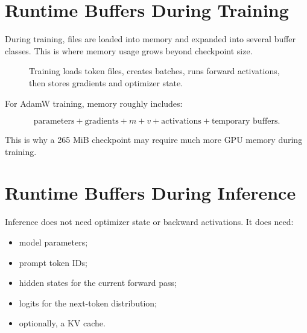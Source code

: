 \section{Runtime Buffers During Training}

During training, files are loaded into memory and expanded into several buffer classes.
This is where memory usage grows beyond checkpoint size.

\begin{figure}[htbp]
\centering
{}
\caption{Training loads token files, creates batches, runs forward activations, then stores gradients and optimizer state.}
\end{figure}

For AdamW training, memory roughly includes:

\[
\text{parameters} + \text{gradients} + m + v + \text{activations} + \text{temporary buffers}.
\]

This is why a 265 MiB checkpoint may require much more GPU memory during training.

\section{Runtime Buffers During Inference}

Inference does not need optimizer state or backward activations. It does need:

\begin{itemize}
  \item model parameters;
  \item prompt token IDs;
  \item hidden states for the current forward pass;
  \item logits for the next-token distribution;
  \item optionally, a KV cache.
\end{itemize}

